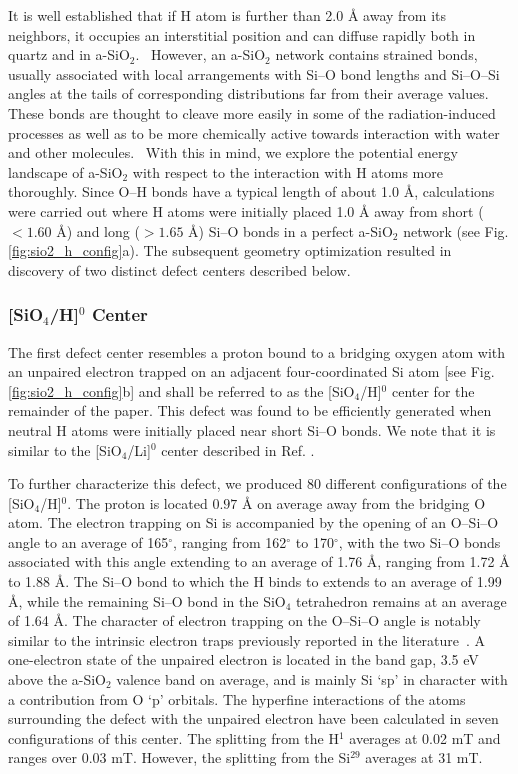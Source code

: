 \documentclass[aps,prb,reprint,superscriptaddress,showpacs]{revtex4-1}
\begin{document}
It is well established that if H atom is further than 2.0 {\AA} away from its neighbors, it occupies an interstitial position and can diffuse rapidly both in quartz and in a-SiO$_2$.~\cite{skuja_hdiffusion,godet_hydrogen,blochl_vacancies} However, an a-SiO$_2$ network contains strained bonds, usually associated with local arrangements with \mbox{Si--O} bond lengths and \mbox{Si--O--Si} angles at the tails of corresponding distributions far from their average values. These bonds are thought to cleave more easily in some of the radiation-induced processes as well as to be more chemically active towards interaction with water and other molecules.~\cite{awazu} With this in mind, we explore the potential energy landscape of a-SiO$_2$ with respect to the interaction with H atoms more thoroughly. Since \mbox{O--H} bonds have a typical length of about 1.0 {\AA}, calculations were carried out where H atoms were initially placed 1.0 {\AA} away from short ($< 1.60$ {\AA}) and long ($> 1.65$ {\AA}) \mbox{Si--O} bonds in a perfect a-SiO$_2$ network (see Fig. \ref{fig:sio2_h_config}a). The subsequent geometry optimization resulted in discovery of two distinct defect centers described below.

\subsubsection{[SiO$_4$/H]$^0$ Center}

The first defect center resembles a proton bound to a bridging oxygen atom with an unpaired electron trapped on an adjacent four-coordinated Si atom [see Fig. \ref{fig:sio2_h_config}b] and shall be referred to as the [SiO$_4$/H]$^0$ center for the remainder of the paper. This defect was found to be efficiently generated when neutral H atoms were initially placed near short \mbox{Si--O} bonds. We note that it is similar to the [SiO$_4$/Li]$^0$ center described in Ref. \cite{aelsayed_prb}. 

To further characterize this defect, we produced 80 different configurations of the [SiO$_4$/H]$^0$. The proton is located $0.97$ {\AA} on average away from the bridging O atom. The electron trapping on Si is accompanied by the opening of an \mbox{O--Si--O} angle to an average of 165$^\circ$, ranging from 162$^\circ$ to 170$^\circ$, with the two \mbox{Si--O} bonds associated with this angle extending to an average of 1.76 {\AA}, ranging from 1.72 {\AA} to 1.88 {\AA}. The \mbox{Si--O} bond to which the H binds to extends to an average of 1.99 {\AA}, while the remaining \mbox{Si--O} bond in the SiO$_4$ tetrahedron remains at an average of 1.64 {\AA}. The character of electron trapping on the \mbox{O--Si--O} angle is notably similar to the intrinsic electron traps previously reported in the literature~\cite{electron_trap_sio2,aelsayed_prb}. A one-electron state of the unpaired electron is located in the band gap, 3.5 eV above the a-SiO$_2$ valence band on average, and is mainly Si `sp' in character with a contribution from O `p' orbitals. The hyperfine interactions of the atoms surrounding the defect with the unpaired electron have been calculated in seven configurations of this center. The splitting from the H$^1$ averages at 0.02 mT and ranges over 0.03 mT. However, the splitting from the Si$^{29}$ averages at 31 mT. 
\end{document}
